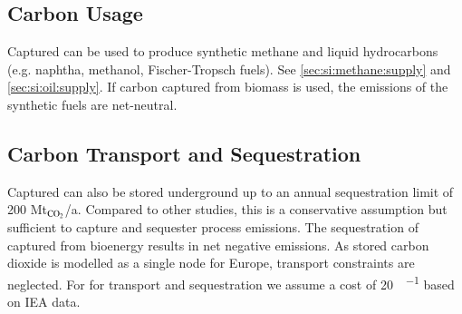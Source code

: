 \subsection{Carbon Usage}

Captured \co can be used to produce synthetic methane and liquid hydrocarbons
(e.g. naphtha, methanol, Fischer-Tropsch fuels). See
\cref{sec:si:methane:supply} and \cref{sec:si:oil:supply}. If carbon captured
from biomass is used, the \co emissions of the synthetic fuels are net-neutral.

\subsection{Carbon Transport and Sequestration}

Captured \co can also be stored underground up to an annual sequestration limit
of 200 Mt$_{\ce{CO2}}$/a. Compared to other studies, this is a conservative assumption but
sufficient to capture and sequester process emissions. The sequestration of
captured \co from bioenergy results in net negative emissions. As stored carbon
dioxide is modelled as a single node for Europe, transport constraints are
neglected. For for \co transport and sequestration we assume a cost of
\SI{20}{\sieuro\per\tco} based on IEA data.
